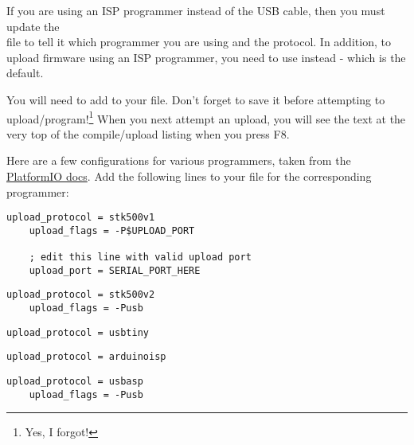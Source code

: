 If you are using an ISP programmer instead of the USB cable, then you must update the\\  file to tell it which programmer you are using and the protocol. In addition, to upload firmware using an ISP programmer, you need to use  instead  - which is the default. 

You will need to add  to your  file. Don't forget to save it before attempting to upload/program!\footnote{Yes, I forgot!} When you next attempt an upload, you will see the text  at the very top of the compile/upload listing when you press F8.


Here are a few configurations for various programmers, taken from the \href{http://docs.platformio.org/en/latest/platforms/atmelavr.html?highlight=usbtiny#upload-using-programmer}{PlatformIO docs}. Add the following lines to your  file for the corresponding programmer:

\begin{lstlisting}[caption={The \inline{platformio.ini} additions for `AVRISP' ISP Programmer}]
    upload_protocol = stk500v1
    upload_flags = -P$UPLOAD_PORT

    ; edit this line with valid upload port
    upload_port = SERIAL_PORT_HERE
\end{lstlisting}


\begin{lstlisting}[caption={The \inline{platformio.ini} additions for `AVRISP MkII' Programmer}]
    upload_protocol = stk500v2
    upload_flags = -Pusb
\end{lstlisting}


\begin{lstlisting}[caption={The \inline{platformio.ini} additions for `USBTinyISP' Programmer}]
    upload_protocol = usbtiny
\end{lstlisting}


\begin{lstlisting}[caption={The \inline{platformio.ini} additions for `ArduinoISP` Programmer}]
    upload_protocol = arduinoisp
\end{lstlisting}


\begin{lstlisting}[caption={The \inline{platformio.ini} additions for `USBasp' ISP Programmer}]
    upload_protocol = usbasp
    upload_flags = -Pusb
\end{lstlisting}


